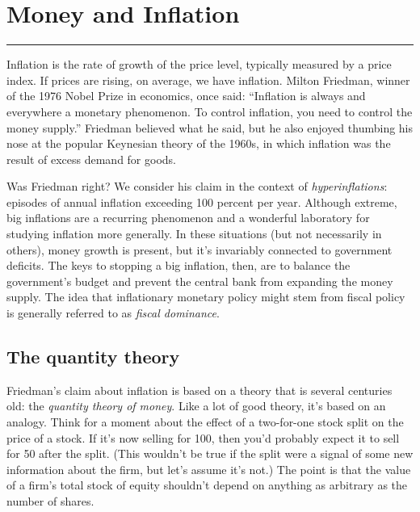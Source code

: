 \chapter{Money and Inflation}\label{chp:mpin}
\hypertarget{inflation}{}


\rule{\textwidth}{1pt}

Inflation is the rate of growth of the price level,
typically measured by a price index. 
If prices are rising, on average, we have inflation.
Milton Friedman, winner of the 1976 Nobel Prize in economics, once
said: ``Inflation is always and everywhere a monetary phenomenon.
To control inflation, you need to control the money supply.''
Friedman believed what he said, but he also enjoyed
thumbing his nose at the popular Keynesian theory of the 1960s,
in which inflation was the result of excess demand for goods.

Was Friedman right?
We consider his claim in the context of {\it hyperinflations\/}:
episodes of annual inflation exceeding 100 percent per year.
Although extreme, big inflations are a recurring phenomenon
and a wonderful laboratory for
studying inflation more generally.
In these situations (but not necessarily in others),
money growth is present,
but it's invariably connected to government deficits.
The keys to stopping a big inflation, then, are to
balance the government's budget and prevent the central bank from expanding the money supply.
The idea that inflationary monetary policy might stem from
fiscal policy is generally referred to as {\it fiscal dominance\/}.


\section{The quantity theory }

Friedman's claim about inflation is based on a theory that is
several centuries old: the {\it quantity theory of
money\/}.  Like a lot of good theory, it's based on an analogy. Think
for a moment about the effect of a two-for-one stock split on the
price of a stock. If it's now selling for 100, then you'd probably
expect it to sell for 50 after the split. (This wouldn't be true if
the split were a signal of some new information about the firm,
but let's assume it's not.) The point is that the value of a firm's
total stock of equity shouldn't depend on anything as arbitrary as
the number of shares.

